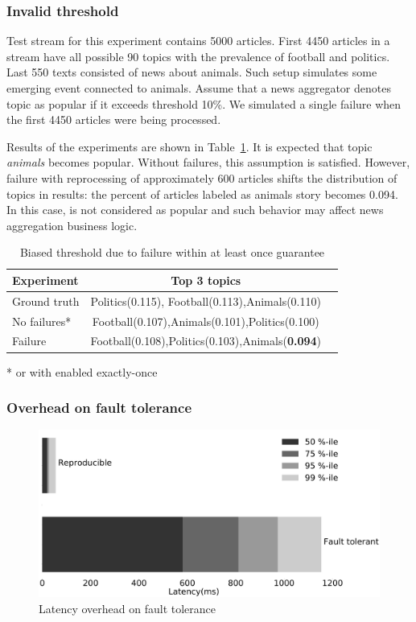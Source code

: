 \subsubsection{Invalid threshold}


Test stream for this experiment contains 5000 articles. First 4450 articles in a stream have all possible 90 topics with the prevalence of football and politics. Last 550 texts consisted of news about animals. Such setup simulates some emerging event connected to animals. Assume that a news aggregator denotes topic as popular if it exceeds threshold 10\%. We simulated a single failure when the first 4450 articles were being processed.

Results of the experiments are shown in Table~\ref{biased_threshold}. It is expected that topic {\em animals} becomes popular. Without failures, this assumption is satisfied. However, failure with reprocessing of approximately 600 articles shifts the distribution of topics in results: the percent of articles labeled as animals story becomes 0.094. In this case, is not considered as popular and such behavior may affect news aggregation business logic.

\begin{table}[htbp]
\caption{Biased threshold due to failure within at least once guarantee}
\begin{threeparttable}
\begin{tabular}{lcl}
Experiment    & Top 3 topics    \\
\hline
Ground truth   &   Politics(0.115), Football(0.113),Animals(0.110)    \\
No failures*   &   Football(0.107),Animals(0.101),Politics(0.100)    \\
Failure   &   Football(0.108),Politics(0.103),Animals({\bf 0.094})    \\
\end{tabular}
* or with enabled exactly-once
\end{threeparttable}
\label{biased_threshold}
\end{table}

\subsubsection{Overhead on fault tolerance}

\begin{figure}[htbp]
  \centering
  \includegraphics[scale=0.1]{pics/fault_tolerance}
  \caption{Latency overhead on fault tolerance}
  \label {fault_tolerance}
\end{figure}

